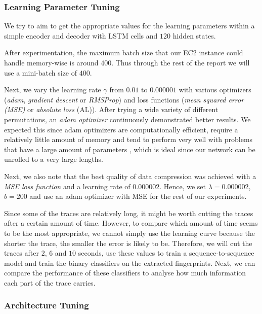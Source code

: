 \subsubsection{Learning Parameter Tuning}

We try to aim to get the appropriate values for the learning parameters within a simple encoder and decoder with LSTM cells and $120$ hidden states.

After experimentation, the maximum batch size that our EC2 instance could handle memory-wise is around $400$.
Thus through the rest of the report we will use a mini-batch size of $400$.

Next, we vary the learning rate $\gamma$ from $0.01$ to $0.000001$ with various optimizers (\textit{adam}, \textit{gradient descent} or \textit{RMSProp}) and loss functions (\textit{mean squared error (MSE)} or \textit{absolute loss} (AL)).
After trying a wide variety of different permutations, an \textit{adam optimizer} continuously demonstrated better results.
We expected this since adam optimizers are computationally efficient, require a relatively little amount of memory and tend to perform very well with problems that have a large amount of parameters \cite{kingma2014adam},
which is ideal since our network can be unrolled to a very large lengths.

Next, we also note that the best quality of data compression was achieved with a \textit{MSE loss function} and a learning rate of $0.000002$.
Hence, we set $\lambda = 0.000002$, $b = 200$ and use an adam optimizer with MSE for the rest of our experiments.

Since some of the traces are relatively long, it might be worth cutting the traces after a certain amount of time.
However, to compare which amount of time seems to be the most appropriate, we cannot simply use the learning curve because the shorter the trace, the smaller the error is likely to be.
Therefore, we will cut the traces after $2$, $6$ and $10$ seconds, use these values to train a sequence-to-sequence model and train the binary classifiers on the extracted fingerprints.
Next, we can compare the performance of these classifiers to analyse how much information each part of the trace carries.



\subsubsection{Architecture Tuning}

